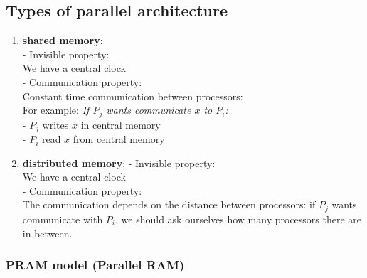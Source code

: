 \subsection{Types of parallel architecture}

\begin{enumerate}
 \item \textbf{shared memory}:\\ 
  - Invisible property:\\
   We have a central clock\\
  - Communication property:\\
   Constant time communication between processors:\\
   For example: \textit{If $P_j$ wants communicate $x$ to $P_i$:}\\
   - $P_j$ writes $x$ in central memory\\
   - $P_i$ read $x$ from central memory
 \item \textbf{distributed memory}:
  - Invisible property:\\
   We have a central clock\\
  - Communication property:\\
   The communication depends on the distance between processors: if $P_j$ wants communicate with $P_i$, we should ask ourselves how many processors there are in between.
\end{enumerate}

\subsubsection{PRAM model (Parallel RAM)}